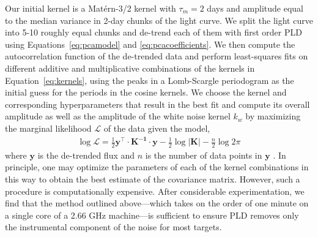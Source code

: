 \documentclass[]{emulateapj}
\begin{document}
Our initial kernel is a Mat\'ern-3/2 kernel with $\tau_m = 2$ days and amplitude
equal to the median variance in 2-day chunks of the light curve. We split the light curve
into 5-10 roughly equal chunks and de-trend each of them with first order PLD
using Equations~\ref{eq:pcamodel} and \ref{eq:pcacoefficients}. We then compute the 
autocorrelation function of the de-trended data and perform least-squares fits
on different additive and multiplicative combinations of the kernels in Equation~\ref{eq:kernels}, using
the peaks in a Lomb-Scargle periodogram as the initial
guess for the periods in the cosine kernels. We choose the kernel and corresponding
hyperparameters that result in the best fit and compute its overall amplitude
as well as the amplitude of the white noise kernel $k_w$
by maximizing the marginal likelihood $\mathcal{L}$ of the data given the model,
\begin{align}
\label{eq:like}
\log\mathcal{L} = \frac{1}{2}\mathbf{y}^\top\cdot\mathbf{K^{-1}}\cdot\mathbf{y} - \frac{1}{2}\log\left|\mathbf{K}\right| - \frac{n}{2}\log 2\pi
\end{align}
where $\mathbf{y}$ is the de-trended flux and $n$ is the number of data points 
in $\mathbf{y}$ \citep{RW06}. In principle, one may optimize the parameters of each
of the kernel combinations in this way to obtain the best estimate of the covariance
matrix. However, such a procedure is computationally expensive. After considerable
experimentation, we find that the method outlined above---which takes on the order of one
minute on a single core of a 2.66 GHz machine---is sufficient to ensure PLD removes
only the instrumental component of the noise for most targets.
\end{document}
